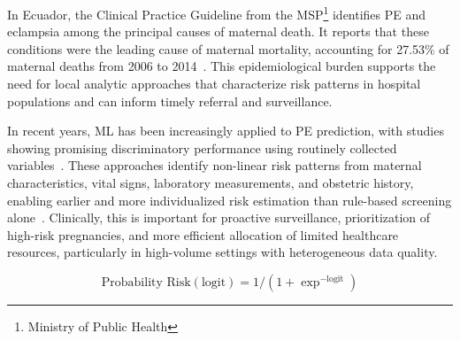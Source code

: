 \documentclass[diagnostics,article,submit,pdftex,moreauthors]{Definitions/mdpi}
\begin{document}
In Ecuador, the Clinical Practice Guideline from the \ac{MSP}\footnote{ Ministry of Public Health} identifies
\ac{PE} and eclampsia among the principal causes of maternal
death. It reports that these conditions were the leading cause of
maternal mortality, accounting for 27.53\% of maternal deaths from
2006 to 2014~\cite{msp_ecuador_hdp_2013}. This epidemiological burden
supports the need for local analytic approaches that characterize risk
patterns in hospital populations and can inform timely referral and
surveillance.

In recent years, \ac{ML} has been increasingly applied to \ac{PE}
prediction, with studies showing promising discriminatory performance
using routinely collected variables~\cite{LI2021102,mennickent_2023,Darsareh2024,Rahman2023}.
These approaches identify non-linear risk patterns from maternal
characteristics, vital signs, laboratory measurements, and obstetric
history, enabling earlier and more individualized risk estimation than
rule-based screening alone~\cite{LI2021102,mennickent_2023}. Clinically,
this is important for proactive surveillance, prioritization of
high-risk pregnancies, and more efficient allocation of limited
healthcare resources, particularly in high-volume settings with
heterogeneous data quality.


\begin{linenomath}
\begin{equation}
  \text{Probability Risk}(\text{logit})=1/(1+\exp^{-\text{logit}})
  \label{eq:logistic-regression}
\end{equation}
\end{linenomath}
\end{document}
